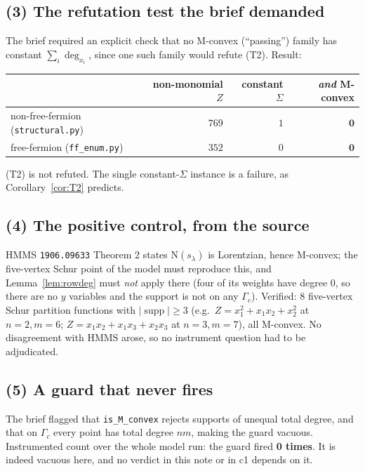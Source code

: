 \documentclass[11pt]{article}
\theoremstyle{definition}
\newcommand{\supp}{\operatorname{supp}}
\newcommand{\N}{\mathrm{N}}
\begin{document}
\subsection*{(3) The refutation test the brief demanded}

The brief required an explicit check that no M-convex (``passing'') family has constant
$\sum_i\deg_{x_i}$, since one such family would refute (T2). Result:
\begin{center}
\begin{tabular}{lrrr}
\hline
 & non-monomial $Z$ & constant $\Sigma$ & \emph{and} M-convex\\
\hline
non-free-fermion (\texttt{structural.py}) & $769$ & $1$ & $\mathbf{0}$\\
free-fermion (\texttt{ff\_enum.py})       & $352$ & $0$ & $\mathbf{0}$\\
\hline
\end{tabular}
\end{center}
(T2) is not refuted. The single constant-$\Sigma$ instance is a failure, as
Corollary~\ref{cor:T2} predicts.

\subsection*{(4) The positive control, from the source}

HMMS \texttt{1906.09633} Theorem 2 states $\N(s_\lambda)$ is Lorentzian, hence M-convex; the
five-vertex Schur point of the model must reproduce this, and
Lemma~\ref{lem:rowdeg} must \emph{not} apply there (four of its weights have degree $0$, so
there are no $y$ variables and the support is not on any $\Gamma_c$). Verified: $8$
five-vertex Schur partition functions with $|\supp|\ge3$ (e.g.\
$Z=x_1^2+x_1x_2+x_2^2$ at $n=2,m=6$; $Z=x_1x_2+x_1x_3+x_2x_3$ at $n=3,m=7$), all M-convex.
No disagreement with HMMS arose, so no instrument question had to be adjudicated.

\subsection*{(5) A guard that never fires}

The brief flagged that \texttt{is\_M\_convex} rejects supports of unequal total degree, and
that on $\Gamma_c$ every point has total degree $nm$, making the guard vacuous. Instrumented
count over the whole model run: the guard fired \textbf{0 times}. It is indeed vacuous here,
and no verdict in this note or in c1 depends on it.
\end{document}
